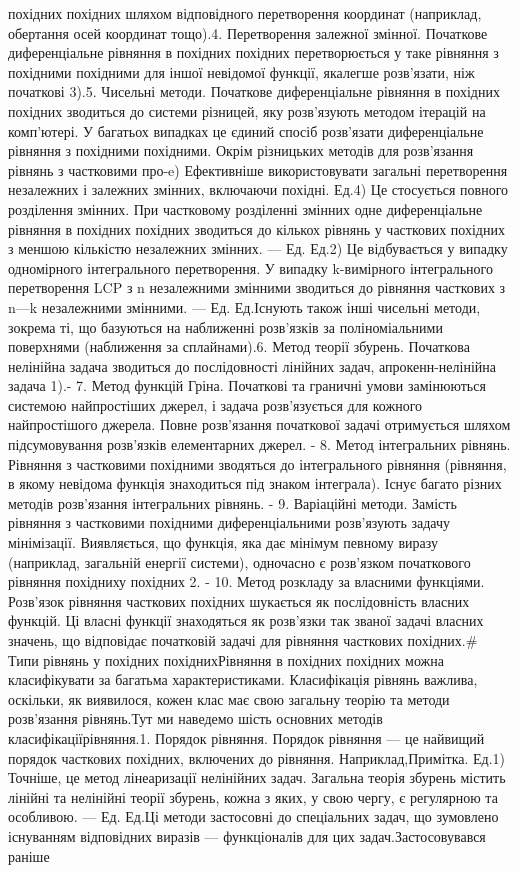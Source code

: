 \documentclass[
  ukrainian,
]{article}
\begin{document}
похідних похідних шляхом відповідного перетворення координат (наприклад,
обертання осей координат тощо).4. Перетворення залежної змінної.
Початкове диференціальне рівняння в похідних похідних перетворюється у
таке рівняння з похідними похідними для іншої невідомої функції,
якалегше розв'язати, ніж початкові 3).5. Чисельні методи. Початкове
диференціальне рівняння в похідних похідних зводиться до системи
різницей, яку розв'язують методом ітерацій на комп'ютері. У багатьох
випадках це єдиний спосіб розв'язати диференціальне рівняння з похідними
похідними. Окрім різницьких методів для розв'язання рівнянь з частковими
про-e) Ефективніше використовувати загальні перетворення незалежних і
залежних змінних, включаючи похідні. Ед.4) Це стосується повного
розділення змінних. При частковому розділенні змінних одне
диференціальне рівняння в похідних похідних зводиться до кількох рівнянь
у часткових похідних з меншою кількістю незалежних змінних. --- Ед.
Ед.2) Це відбувається у випадку одномірного інтегрального перетворення.
У випадку k-вимірного інтегрального перетворення LCP з n незалежними
змінними зводиться до рівняння часткових з n---k незалежними змінними.
--- Ед. Ед.Існують також інші чисельні методи, зокрема ті, що базуються
на наближенні розв'язків за поліноміальними поверхнями (наближення за
сплайнами).6. Метод теорії збурень. Початкова нелінійна задача зводиться
до послідовності лінійних задач, апрокенн-нелінійна задача 1).- 7. Метод
функцій Гріна. Початкові та граничні умови замінюються системою
найпростіших джерел, і задача розв'язується для кожного найпростішого
джерела. Повне розв'язання початкової задачі отримується шляхом
підсумовування розв'язків елементарних джерел. - 8. Метод інтегральних
рівнянь. Рівняння з частковими похідними зводяться до інтегрального
рівняння (рівняння, в якому невідома функція знаходиться під знаком
інтеграла). Існує багато різних методів розв'язання інтегральних
рівнянь. - 9. Варіаційні методи. Замість рівняння з частковими похідними
диференціальними розв'язують задачу мінімізації. Виявляється, що
функція, яка дає мінімум певному виразу (наприклад, загальній енергії
системи), одночасно є розв'язком початкового рівняння похідниху похідних
2. - 10. Метод розкладу за власними функціями. Розв'язок рівняння
часткових похідних шукається як послідовність власних функцій. Ці власні
функції знаходяться як розв'язки так званої задачі власних значень, що
відповідає початковій задачі для рівняння часткових похідних.\# Типи
рівнянь у похідних похіднихРівняння в похідних похідних можна
класифікувати за багатьма характеристиками. Класифікація рівнянь
важлива, оскільки, як виявилося, кожен клас має свою загальну теорію та
методи розв'язання рівнянь.Тут ми наведемо шість основних методів
класифікаціїрівняння.1. Порядок рівняння. Порядок рівняння --- це
найвищий порядок часткових похідних, включених до рівняння.
Наприклад,Примітка. Ед.1) Точніше, це метод лінеаризації нелінійних
задач. Загальна теорія збурень містить лінійні та нелінійні теорії
збурень, кожна з яких, у свою чергу, є регулярною та особливою. --- Ед.
Ед.Ці методи застосовні до спеціальних задач, що зумовлено існуванням
відповідних виразів --- функціоналів для цих задач.Застосовувався раніше
\end{document}
